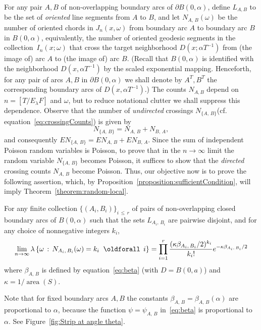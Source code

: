 \documentclass[AHL, Unicode, longabstracts, published]{cedram}
\DeclareMathOperator{\area}{area}
\renewcommand*{\forall}{\mathrel{\oldforall}}
\begin{document}
For any pair $A,B$ of non-overlapping boundary arcs of $\partial B (0,\alpha)$, define $L_{A,B}$ to be the set of
\emph{oriented} line segments from $A$ to $B$, and let $N_{A,\,B} (\omega)$ be the number of oriented chords in $J_{n} (x,\omega)$ from boundary arc $A$ to boundary arc $B$ in $B(0,\alpha)$, equivalently, the number of oriented geodesic segments in the collection~$I_{n} (x;\omega)$ that cross the target neighborhood $D(x;\alpha T^{-1})$ from (the image of) arc $A$ to (the image of) arc $B$. (Recall that $B (0,\alpha)$ is identified with the neighborhood $D(x,\alpha T^{-1})$ by the scaled exponential mapping. Henceforth, for any pair of arcs $A,B$ in $\partial B(0, \alpha)$ we shall denote by $A^{T},B^{T}$ the corresponding boundary arcs of $D(x,\alpha T^{-1})$.) The counts $N_{A,B}$ depend on $n=[T/E_{\lambda}F]$ and $\omega$, but to reduce notational clutter we shall suppress this dependence. Observe that the number of \emph{undirected} crossings $N_{\{A,\,B \}}$(cf. equation~\eqref{eq:crossingCounts}) is given by
\[
N_{\{A,\,B \}}=N_{A,\,B}+N_{B,\,A},
\]
and consequently $EN_{\{A,\,B \}}=EN_{A,\,B}+EN_{B,\,A}$. Since the sum of independent Poisson random variables is Poisson, to prove that in the $n \rightarrow \infty$ limit the random variable $N_{\{A,\,B\}}$ becomes Poisson, it suffices to show that the \emph{directed} crossing counts $N_{A,\,B}$ become Poisson. Thus, our objective now is to prove the following assertion, which, by Proposition~\ref{proposition:sufficientCondition}, will imply Theorem~\ref{theorem:random-local}.

\begin{prop}\label{proposition:reformulation}
For any finite collection $\{(A_{i},B_{i}) \}_{i\,\leq \,r}$ of pairs of non-overlapping closed boundary arcs of $B (0,\alpha)$ such that the sets $L_{A_{i},\,B_{i}}$ are pairwise disjoint, and for any choice of nonnegative integers $k_{i}$,
\begin{equation}\label{eq:reformulation}
\lim_{n \rightarrow \infty} \lambda \left\{\omega \,:\, N_{A_{i},\,B_{i}} (\omega)=k_{i} \; \forall \,i \right\} =\prod_{i=1}^{r} \frac{(\kappa
\beta_{A_{i},\,B_{i}}/2)^{k_{i}}}{k_{i}!} e^{- \kappa \beta_{A_{i},\,B_{i}}/2}
\end{equation}
where $\beta_{A,\,B}$ is defined by equation~\eqref{eq:beta} (with $D=B(0,a)$) and $\kappa=1/\area(S)$.
\end{prop}

Note that for fixed boundary arcs $A,B$ the constants $\beta_{A,\,B}=\beta_{A,\,B}(\alpha)$ are proportional to $\alpha$, because the function $\psi =\psi_{A,\,B}$ in~\eqref{eq:beta} is proportional to $\alpha$. See Figure~\ref{fig:Strip at angle theta}.
\end{document}
